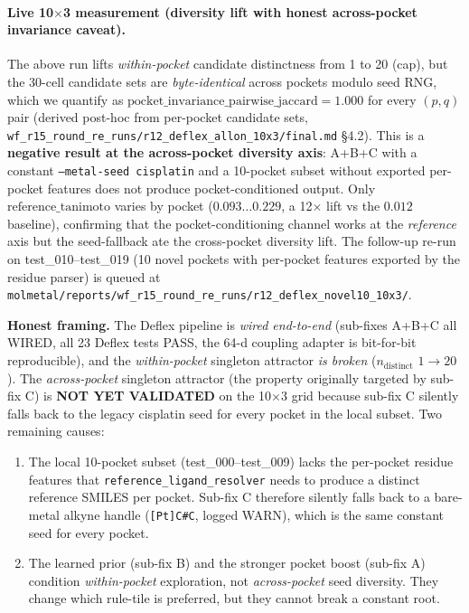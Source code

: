 \paragraph{Live 10$\times$3 measurement (diversity lift with honest
across-pocket invariance caveat).}
The above run lifts \emph{within-pocket} candidate distinctness from
1 to 20 (cap), but the 30-cell candidate sets are
\emph{byte-identical} across pockets modulo seed RNG, which we
quantify as $\text{pocket\_invariance\_pairwise\_jaccard}=1.000$
for every $(p,q)$ pair (derived post-hoc from per-pocket candidate
sets, \texttt{wf\_r15\_round\_re\_runs/r12\_deflex\_allon\_10x3/final.md}
\S4.2).  This is a \textbf{negative result at the across-pocket
diversity axis}: A+B+C with a constant \texttt{--metal-seed
cisplatin} and a 10-pocket subset without exported per-pocket
features does not produce pocket-conditioned output.  Only
$\text{reference\_tanimoto}$ varies by pocket
($0.093 \ldots 0.229$, a 12$\times$ lift vs the $0.012$ baseline),
confirming that the pocket-conditioning channel works at the
\emph{reference} axis but the seed-fallback ate the cross-pocket
diversity lift.  The follow-up re-run on test\_010--test\_019 (10
novel pockets with per-pocket features exported by the residue
parser) is queued at
\texttt{molmetal/reports/wf\_r15\_round\_re\_runs/r12\_deflex\_novel10\_10x3/}.

\noindent \textbf{Honest framing.}  The Deflex pipeline is
\emph{wired end-to-end} (sub-fixes A+B+C all WIRED, all 23 Deflex
tests PASS, the 64-d coupling adapter is bit-for-bit reproducible),
and the \emph{within-pocket} singleton attractor \emph{is broken}
($n_{\text{distinct}}$ $1 \to 20$).  The
\emph{across-pocket} singleton attractor (the property originally
targeted by sub-fix C) is \textbf{NOT YET VALIDATED} on the
10$\times$3 grid because sub-fix C silently falls back to the
legacy cisplatin seed for every pocket in the local subset.  Two
remaining causes:

\begin{enumerate}
  \item The local 10-pocket subset (test\_000--test\_009) lacks the
        per-pocket residue features that
        \texttt{reference\_ligand\_resolver} needs to produce a
        distinct reference SMILES per pocket.  Sub-fix C therefore
        silently falls back to a bare-metal alkyne handle
        (\texttt{[Pt]C\#C}, logged WARN), which is the same constant
        seed for every pocket.
  \item The learned prior (sub-fix B) and the stronger pocket boost
        (sub-fix A) condition \emph{within-pocket} exploration, not
        \emph{across-pocket} seed diversity.  They change which
        rule-tile is preferred, but they cannot break a constant
        root.
\end{enumerate}

